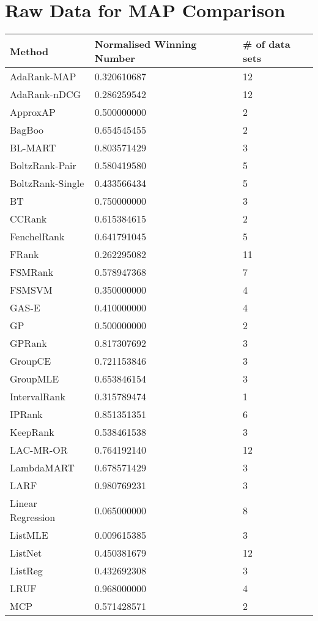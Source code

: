 \chapter{Raw Data for MAP Comparison}
\label{app:norm_winnum_map}

\begin{longtable}{l|l|l}
Method & Normalised Winning Number & \# of data sets \\
\hline
AdaRank-\acs{MAP} & 0.320610687 & 12 \\ 
AdaRank-\acs{nDCG} & 0.286259542 & 12 \\ 
Approx\acs{AP} & 0.500000000 & 2 \\ 
BagBoo & 0.654545455 & 2 \\ 
BL-MART & 0.803571429 & 3 \\ 
BoltzRank-Pair & 0.580419580 & 5 \\ 
BoltzRank-Single & 0.433566434 & 5 \\ 
BT & 0.750000000 & 3 \\ 
CCRank & 0.615384615 & 2 \\ 
FenchelRank & 0.641791045 & 5 \\ 
FRank & 0.262295082 & 11 \\ 
FSMRank & 0.578947368 & 7 \\ 
FSM\acs{SVM} & 0.350000000 & 4 \\ 
GAS-E & 0.410000000 & 4 \\ 
\acs{GP} & 0.500000000 & 2 \\ 
\acs{GP}Rank & 0.817307692 & 3 \\ 
GroupCE & 0.721153846 & 3 \\ 
Group\acs{MLE} & 0.653846154 & 3 \\ 
IntervalRank & 0.315789474 & 1 \\ 
\acs{IP}Rank & 0.851351351 & 6 \\ 
KeepRank & 0.538461538 & 3 \\ 
LAC-MR-OR & 0.764192140 & 12 \\ 
LambdaMART & 0.678571429 & 3 \\ 
LARF & 0.980769231 & 3 \\ 
Linear Regression & 0.065000000 & 8 \\ 
List\acs{MLE} & 0.009615385 & 3 \\ 
ListNet & 0.450381679 & 12 \\ 
ListReg & 0.432692308 & 3 \\ 
LRUF & 0.968000000 & 4 \\ 
MCP & 0.571428571 & 2 \\ 

\end{longtable}
